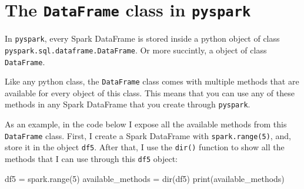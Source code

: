 \documentclass[
  11pt,
  letterpaper,
  DIV=11,
  numbers=noendperiod]{scrreprt}
\newenvironment{Shaded}{\begin{snugshade}}{\end{snugshade}}
\newcommand{\BuiltInTok}[1]{\textcolor[rgb]{0.00,0.23,0.31}{#1}}
\newcommand{\DecValTok}[1]{\textcolor[rgb]{0.68,0.00,0.00}{#1}}
\newcommand{\NormalTok}[1]{\textcolor[rgb]{0.00,0.23,0.31}{#1}}
\newcommand{\OperatorTok}[1]{\textcolor[rgb]{0.37,0.37,0.37}{#1}}
\begin{document}
\hypertarget{sec-dataframe-class}{%
\section{\texorpdfstring{The \texttt{DataFrame} class in
\texttt{pyspark}}{The DataFrame class in pyspark}}\label{sec-dataframe-class}}

In \texttt{pyspark}, every Spark DataFrame is stored inside a python
object of class \texttt{pyspark.sql.dataframe.DataFrame}. Or more
succintly, a object of class \texttt{DataFrame}.

Like any python class, the \texttt{DataFrame} class comes with multiple
methods that are available for every object of this class. This means
that you can use any of these methods in any Spark DataFrame that you
create through \texttt{pyspark}.

As an example, in the code below I expose all the available methods from
this \texttt{DataFrame} class. First, I create a Spark DataFrame with
\texttt{spark.range(5)}, and, store it in the object \texttt{df5}. After
that, I use the \texttt{dir()} function to show all the methods that I
can use through this \texttt{df5} object:

\begin{Shaded}
\begin{Highlighting}[]
\NormalTok{df5 }\OperatorTok{=}\NormalTok{ spark.}\BuiltInTok{range}\NormalTok{(}\DecValTok{5}\NormalTok{)}
\NormalTok{available\_methods }\OperatorTok{=} \BuiltInTok{dir}\NormalTok{(df5)}
\BuiltInTok{print}\NormalTok{(available\_methods)}
\end{Highlighting}
\end{Shaded}
\end{document}
